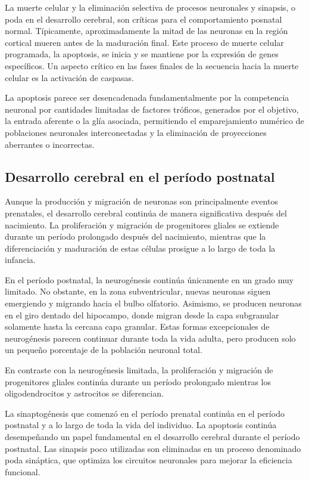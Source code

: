 \documentclass[11pt,letterpaper]{report}
\begin{document}
La muerte celular y la eliminación selectiva de procesos neuronales y sinapsis,
o poda en el desarrollo cerebral, son críticas para el comportamiento posnatal
normal. Típicamente, aproximadamente la mitad de las neuronas en la región
cortical mueren antes de la maduración final. Este proceso de muerte celular
programada, la apoptosis, se inicia y se mantiene por la expresión de genes
específicos. Un aspecto crítico en las fases finales de la secuencia hacia la
muerte celular es la activación de caspasas. \cite{Polin124}

La apoptosis parece ser desencadenada fundamentalmente por la competencia
neuronal por cantidades limitadas de factores tróficos, generados por el
objetivo, la entrada aferente o la glía asociada, permitiendo el emparejamiento
numérico de poblaciones neuronales interconectadas y la eliminación de
proyecciones aberrantes o incorrectas. \cite{Polin124}

\subsection{Desarrollo cerebral en el período postnatal}
Aunque la producción y migración de neuronas son principalmente eventos
prenatales, el desarrollo cerebral continúa de manera significativa después del
nacimiento. La proliferación y migración de progenitores gliales se extiende
durante un período prolongado después del nacimiento, mientras que la
diferenciación y maduración de estas células prosigue a lo largo de toda la
infancia. \cite{Stiles2010}

En el período postnatal, la neurogénesis continúa únicamente en un grado muy
limitado. No obstante, en la zona subventricular, nuevas neuronas siguen
emergiendo y migrando hacia el bulbo olfatorio. Asimismo, se producen neuronas
en el giro dentado del hipocampo, donde migran desde la capa subgranular
solamente hasta la cercana capa granular. Estas formas excepcionales de
neurogénesis parecen continuar durante toda la vida adulta, pero producen solo
un pequeño porcentaje de la población neuronal total.
\cite{Stiles2010}

En contraste con la neurogénesis limitada, la proliferación y migración de
progenitores gliales continúa durante un período prolongado mientras los
oligodendrocitos y astrocitos se diferencian. \cite{Stiles2010}

La sinaptogénesis que comenzó en el período prenatal continúa en el período
postnatal y a lo largo de toda la vida del individuo. La apoptosis continúa
desempeñando un papel fundamental en el desarrollo cerebral durante el período
postnatal. Las sinapsis poco utilizadas son eliminadas en un proceso denominado
poda sináptica, que optimiza los circuitos neuronales para mejorar la
eficiencia funcional. \cite{Gibb2018}
\end{document}
